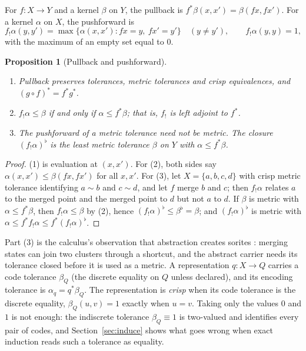 \documentclass[11pt]{article}
\theoremstyle{definition}
\theoremstyle{plain}
\newtheorem{proposition}[definition]{Proposition}
\begin{document}
For $f:X\to Y$ and a kernel $\beta$ on $Y$, the pullback is $f^*\beta(x,x')=\beta(fx,fx')$. For a
kernel $\alpha$ on $X$, the pushforward is
\[
f_!\alpha(y,y')=\max\{\alpha(x,x'):fx=y,\ fx'=y'\}\quad(y\ne y'),\qquad f_!\alpha(y,y)=1,
\]
with the maximum of an empty set equal to $0$.

\begin{proposition}[Pullback and pushforward]\label{prop:galois}\mbox{}
\begin{enumerate}
\item Pullback preserves tolerances, metric tolerances and crisp equivalences, and
$(g\circ f)^*=f^*g^*$.
\item $f_!\alpha\le\beta$ if and only if $\alpha\le f^*\beta$; that is, $f_!$ is left adjoint
to $f^*$.
\item The pushforward of a metric tolerance need not be metric. The closure $(f_!\alpha)^\flat$
is the least metric tolerance $\beta$ on $Y$ with $\alpha\le f^*\beta$.
\end{enumerate}
\end{proposition}

\begin{proof}
(1) is evaluation at $(x,x')$. For (2), both sides say $\alpha(x,x')\le\beta(fx,fx')$ for all
$x,x'$. For (3), let $X=\{a,b,c,d\}$ with crisp metric tolerance identifying $a\sim b$ and
$c\sim d$, and let $f$ merge $b$ and $c$; then $f_!\alpha$ relates $a$ to the merged point and
the merged point to $d$ but not $a$ to $d$. If $\beta$ is metric with $\alpha\le f^*\beta$,
then $f_!\alpha\le\beta$ by (2), hence $(f_!\alpha)^\flat\le\beta^\flat=\beta$; and
$(f_!\alpha)^\flat$ is metric with $\alpha\le f^*f_!\alpha\le f^*(f_!\alpha)^\flat$.
\end{proof}

Part (3) is the calculus's observation that abstraction creates sorites \cite{dclosure}:
merging states can join two clusters through a shortcut, and the abstract carrier needs its
tolerance closed before it is used as a metric. A representation $q:X\to Q$ carries a code
tolerance $\beta_Q$ (the discrete equality on $Q$ unless declared), and its encoding tolerance is
$\alpha_q=q^*\beta_Q$. The representation is \emph{crisp} when its code tolerance is the discrete
equality, $\beta_Q(u,v)=1$ exactly when $u=v$. Taking only the values $0$ and $1$ is not enough:
the indiscrete tolerance $\beta_Q\equiv1$ is two-valued and identifies every pair of codes, and
Section~\ref{sec:induce} shows what goes wrong when exact induction reads such a tolerance as
equality.
\end{document}
